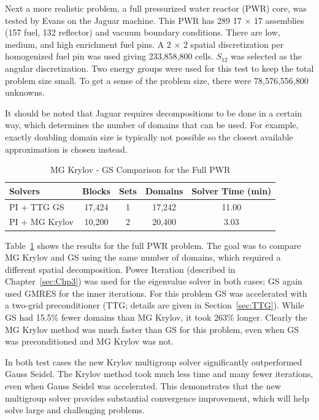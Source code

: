 Next a more realistic problem, a full pressurized water reactor (PWR) core, was tested by Evans on the Jaguar machine. This PWR has 289 17 $\times$ 17 assemblies (157 fuel, 132 reflector) and vacuum boundary conditions. There are low, medium, and high enrichment fuel pins. A 2 $\times$ 2 spatial discretization per homogenized fuel pin was used giving 233,858,800 cells. $S_{12}$ was selected as the angular discretization. Two energy groups were used for this test to keep the total problem size small. To get a sense of the problem size, there were 78,576,556,800 unknowns.

It should be noted that Jaguar requires decompositions to be done in a certain way, which determines the number of domains that can be used. For example, exactly doubling domain size is typically not possible so the closest available approximation is chosen instead.

\begin{table}[!h]
\caption{MG Krylov - GS Comparison for the Full PWR}
\begin{center}
\begin{tabular}{l c c c c}
\hline
Solvers & Blocks & Sets & Domains & Solver Time (min) \\[0.5ex]
\hline
PI + TTG GS & 17,424 & 1 & 17,242 & 11.00 \\
PI + MG Krylov & 10,200 & 2 & 20,400 & 3.03 \\
\hline
\end{tabular}
\end{center}
\label{table:MGkrylovPWR}
\end{table}
%
Table~\ref{table:MGkrylovPWR} shows the results for the full PWR problem. The goal was to compare MG Krylov and GS using the same number of domains, which required a different spatial decomposition. Power Iteration (described in Chapter~\ref{sec:Chp3}) was used for the eigenvalue solver in both cases; GS again used GMRES for the inner iterations. For this problem GS was accelerated with a two-grid preconditioner (TTG; details are given in Section~\ref{sec:TTG}). While GS had 15.5\% fewer domains than MG Krylov, it took 263\% longer. Clearly the MG Krylov method was much faster than GS for this problem, even when GS was preconditioned and MG Krylov was not. 

In both test cases the new Krylov multigroup solver significantly outperformed Gauss Seidel. The Krylov method took much less time and many fewer iterations, even when Gauss Seidel was accelerated. This demonstrates that the new multigroup solver provides substantial convergence improvement, which will help solve large and challenging problems. 

